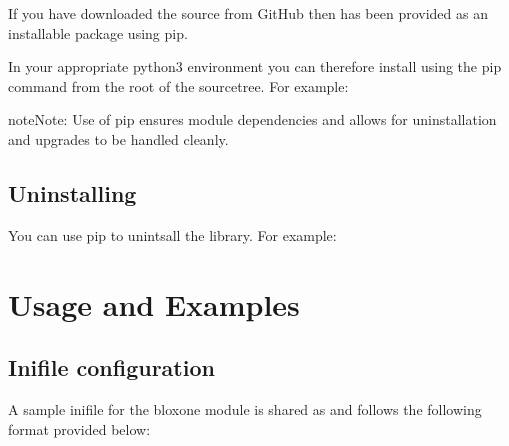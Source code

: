 \documentclass[letterpaper,10pt,english]{sphinxmanual}
\begin{document}
\sphinxAtStartPar
If you have downloaded the source from GitHub then  has been
provided as an installable package using pip.

\sphinxAtStartPar
In your appropriate python3 environment you can therefore install 
using the pip command from the root of the sourcetree. For example:

\begin{sphinxVerbatim}[commandchars=\\\{\}]
   


   
\end{sphinxVerbatim}

\begin{sphinxadmonition}{note}{Note:}
\sphinxAtStartPar
Use of pip ensures module dependencies and allows for
uninstallation and upgrades to be handled cleanly.
\end{sphinxadmonition}


\section{Uninstalling }
\label{\detokenize{installation:uninstalling-bloxone}}
\sphinxAtStartPar
You can use pip to unintsall the library. For example:

\begin{sphinxVerbatim}[commandchars=\\\{\}]
  
\end{sphinxVerbatim}


\chapter{Usage and Examples}
\label{\detokenize{usage:usage-and-examples}}\label{\detokenize{usage::doc}}

\section{Inifile configuration}
\label{\detokenize{usage:inifile-configuration}}
\sphinxAtStartPar
A sample inifile for the bloxone module is shared as  and follows
the following format provided below:
\end{document}
